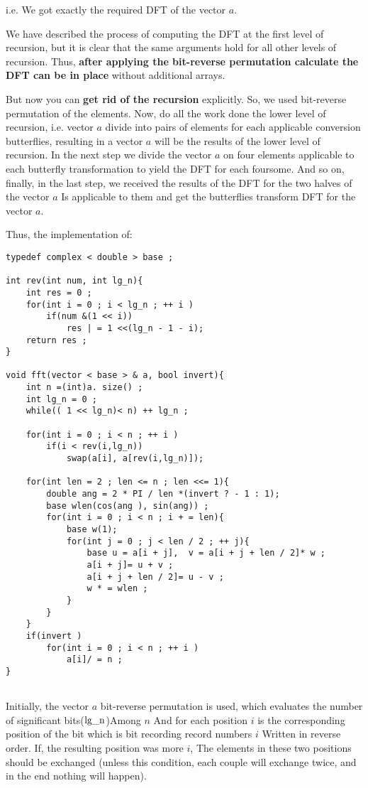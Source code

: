 i.e. We got exactly the required DFT of the vector $a$.

We have described the process of computing the DFT at the first level of recursion, but it is clear that the same arguments hold for all other levels of recursion. Thus, \textbf{after applying the bit-reverse permutation calculate the DFT can be in place} without additional arrays.

But now you can \textbf{get rid of the recursion} explicitly. So, we used bit-reverse permutation of the elements. Now, do all the work done the lower level of recursion, i.e. vector $a$ divide into pairs of elements for each applicable conversion butterflies, resulting in a vector $a$ will be the results of the lower level of recursion. In the next step we divide the vector $a$ on four elements applicable to each butterfly transformation to yield the DFT for each foursome. And so on, finally, in the last step, we received the results of the DFT for the two halves of the vector $a$ Is applicable to them and get the butterflies transform DFT for the vector $a$.

Thus, the implementation of:

\begin{verbatim}
typedef complex < double > base ;
 
int rev(int num, int lg_n){
    int res = 0 ;
    for(int i = 0 ; i < lg_n ; ++ i )
        if(num &(1 << i))
            res | = 1 <<(lg_n - 1 - i);
    return res ;
}
 
void fft(vector < base > & a, bool invert){
    int n =(int)a. size() ;
    int lg_n = 0 ;
    while(( 1 << lg_n)< n) ++ lg_n ;
 
    for(int i = 0 ; i < n ; ++ i )
        if(i < rev(i,lg_n))
            swap(a[i], a[rev(i,lg_n)]);
 
    for(int len = 2 ; len <= n ; len <<= 1){
        double ang = 2 * PI / len *(invert ? - 1 : 1);
        base wlen(cos(ang ), sin(ang)) ;
        for(int i = 0 ; i < n ; i + = len){
            base w(1);
            for(int j = 0 ; j < len / 2 ; ++ j){
                base u = a[i + j],  v = a[i + j + len / 2]* w ;
                a[i + j]= u + v ;
                a[i + j + len / 2]= u - v ;
                w * = wlen ;
            }
        }
    }
    if(invert )
        for(int i = 0 ; i < n ; ++ i )
            a[i]/ = n ;
}
 
\end{verbatim}
Initially, the vector $a$ bit-reverse permutation is used, which evaluates the number of significant bits($\rm lg \_n$)Among $n$ And for each position $i$ is the corresponding position of the bit which is bit recording record numbers $i$ Written in reverse order. If, the resulting position was more $i$, The elements in these two positions should be exchanged (unless this condition, each couple will exchange twice, and in the end nothing will happen).

